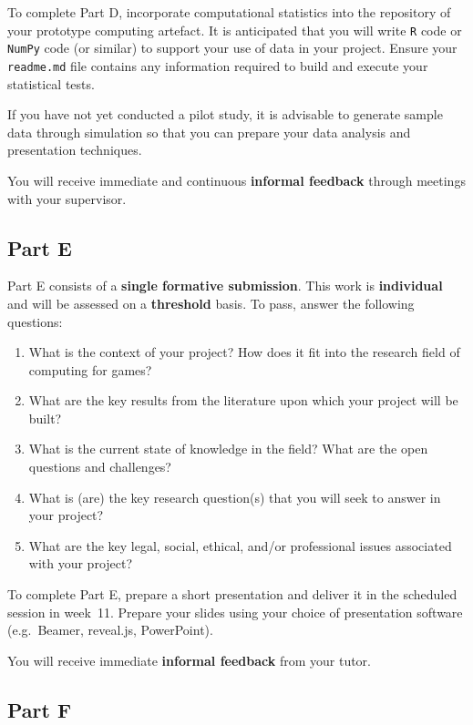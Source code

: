 To complete Part D, incorporate computational statistics into the repository of your prototype computing artefact.
It is anticipated that you will write \texttt{R} code or \texttt{NumPy} code (or similar) to support your use of data in your project.
Ensure your \texttt{readme.md} file contains any information required to build and execute your statistical tests.

If you have not yet conducted a pilot study, it is advisable to generate sample data through simulation so that you can 
prepare your data analysis and presentation techniques.

You will receive immediate and continuous \textbf{informal feedback} through meetings with your supervisor.

\subsection*{Part E}

Part E consists of a \textbf{single formative submission}.
This work is \textbf{individual} and will be assessed on a \textbf{threshold} basis.
To pass, answer the following questions:

\begin{enumerate}[label=(\roman*)]
	\item What is the context of your project? How does it fit into the
		research field of computing for games?
	\item What are the key results from the literature upon which your project will be built?
	\item What is the current state of knowledge in the field?
		What are the open questions and challenges?
	\item What is (are) the key research question(s) that you will seek to
		answer in your project?
	\item What are the key legal, social, ethical, and/or professional issues 
		associated with your project?
\end{enumerate}

To complete Part E, prepare a short presentation 
and deliver it in the scheduled session in week~11.
Prepare your slides using your choice of presentation software
(e.g.\ Beamer, reveal.js, PowerPoint).

You will receive immediate \textbf{informal feedback} from your tutor.

\subsection*{Part F}

